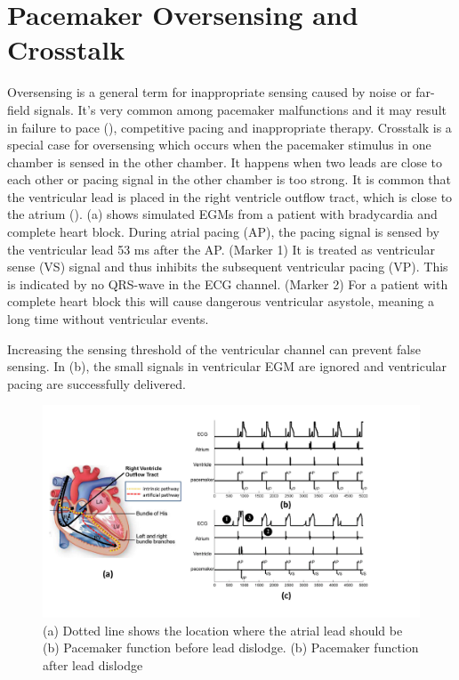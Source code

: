 \section{Pacemaker Oversensing and Crosstalk}
Oversensing is a general term for inappropriate sensing caused by noise or far-field signals. It's very common among pacemaker malfunctions and it may result in failure to pace (\cite{med2, leads}), competitive pacing and inappropriate therapy. Crosstalk is a special case for oversensing which occurs when the pacemaker stimulus in one chamber is sensed in the other chamber. It happens when two leads are close to each other or pacing signal in the other chamber is too strong. It is common that the ventricular lead is placed in the right ventricle outflow tract, which is close to the atrium (\cite{icd}). (a) shows simulated EGMs from a patient with bradycardia and complete heart block. During atrial pacing (AP), the pacing signal is sensed by the ventricular lead 53 ms after the AP. (Marker 1) It is treated as ventricular sense (VS) signal and thus inhibits the subsequent ventricular pacing (VP). This is indicated by no QRS-wave in the ECG channel. (Marker 2) For a patient with complete heart block this will cause dangerous ventricular asystole, meaning a long time without ventricular events.  

Increasing the sensing threshold of the ventricular channel can prevent false sensing. In (b), the small signals in ventricular EGM are ignored and ventricular pacing are successfully delivered. 


\begin{figure}[t]
\centering
\vspace{-10pt}
		\includegraphics[width=\textwidth]{figs/dislodge_all.pdf}
\caption{\small (a) Dotted line shows the location where the atrial lead should be (b) Pacemaker function before lead dislodge. (b) Pacemaker function after lead dislodge}
		\label{fig:dislodge_all}

\end{figure} 



